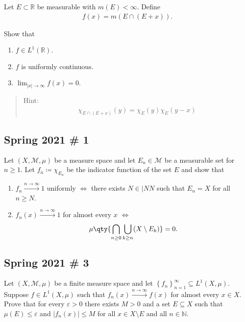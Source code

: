 Let \(E \subset {\mathbb{R}}\) be measurable with \(m(E) < \infty\).
Define
\begin{align*}
f(x)=m(E \cap(E+x)).
\end{align*}

Show that

\begin{enumerate}
\def\labelenumi{\arabic{enumi}.}
\tightlist
\item
  \(f\in L^1({\mathbb{R}})\).
\item
  \(f\) is uniformly continuous.
\item
  \(\lim _{|x| \to \infty} f(x) = 0\).
\end{enumerate}

\begin{quote}
Hint:
\begin{align*}
\chi_{E \cap(E+x)}(y)=\chi_{E}(y) \chi_{E}(y-x)
\end{align*}
\end{quote}

\hypertarget{spring-2021-1}{%
\subsection{Spring 2021 \# 1}\label{spring-2021-1}}

Let \((X, \mathcal{M},\mu)\) be a measure space and let
\(E_n \in \mathcal{M}\) be a measurable set for \(n\geq 1\). Let
\(f_n \coloneqq\chi_{E_n}\) be the indicator function of the set \(E\)
and show that

\begin{enumerate}
\def\labelenumi{\alph{enumi}.}
\item
  \(f_n \overset{n\to\infty}\to 1\) uniformly \(\iff\) there exists
  \(N\in |NN\) such that \(E_n = X\) for all \(n\geq N\).
\item
  \(f_n(x) \overset{n\to\infty}\to 1\) for almost every \(x\) \(\iff\)
  \begin{align*}
  \mu \qty{ \bigcap_{n \geq 0} \bigcup_{k \geq n} (X \setminus E_k) } = 0
  .\end{align*}
\end{enumerate}

\hypertarget{spring-2021-3}{%
\subsection{Spring 2021 \# 3}\label{spring-2021-3}}

Let \((X, \mathcal{M}, \mu)\) be a finite measure space and let
\(\left\{{ f_n}\right\}_{n=1}^{\infty } \subseteq L^1(X, \mu)\). Suppose
\(f\in L^1(X, \mu)\) such that \(f_n(x) \overset{n\to \infty }\to f(x)\)
for almost every \(x \in X\). Prove that for every \(\varepsilon> 0\)
there exists \(M>0\) and a set \(E\subseteq X\) such that
\(\mu(E) \leq \varepsilon\) and
\({\left\lvert {f_n(x)} \right\rvert}\leq M\) for all
\(x\in X\setminus E\) and all \(n\in {\mathbb{N}}\).

